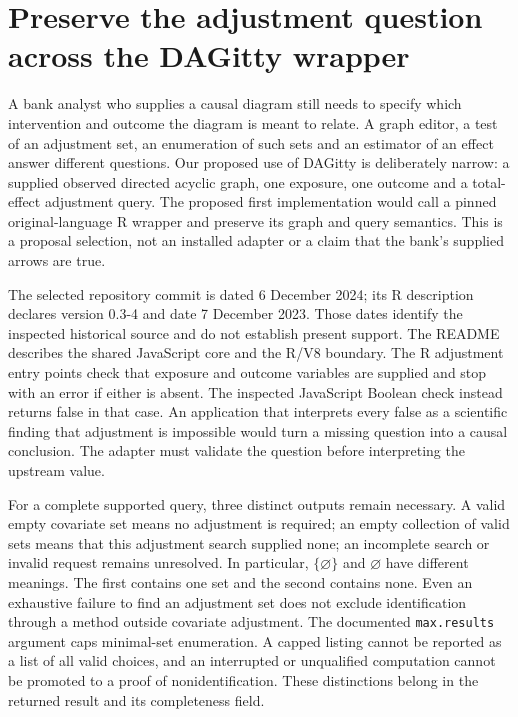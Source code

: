 \section{Preserve the adjustment question across the DAGitty wrapper}
\label{exec18:gp-graph}

A bank analyst who supplies a causal diagram still needs to specify which
intervention and outcome the diagram is meant to relate. A graph editor, a
test of an adjustment set, an enumeration of such sets and an estimator of an
effect answer different questions. Our proposed use of DAGitty is deliberately
narrow: a supplied observed directed acyclic graph, one exposure, one outcome
and a total-effect adjustment query. The proposed first implementation would
call a pinned original-language R wrapper and preserve its graph and query
semantics. This is a proposal selection, not an installed adapter or a claim
that the bank's supplied arrows are true.
\citep{exec18_gp_dagitty}

The selected repository commit is dated 6 December 2024; its R description
declares version 0.3-4 and date 7 December 2023. Those dates identify the
inspected historical source and do not establish present support. The README
describes the shared JavaScript core and the R/V8 boundary. The R adjustment
entry points check that exposure and outcome variables are supplied and stop
with an error if either is absent. The inspected JavaScript Boolean check
instead returns false in that case. An application that interprets every false
as a scientific finding that adjustment is impossible would turn a missing
question into a causal conclusion. The adapter must validate the question
before interpreting the upstream value. \citep{exec18_gp_dagitty}

For a complete supported query, three distinct outputs remain necessary.
A valid empty covariate set means no adjustment is required; an empty
collection of valid sets means that this adjustment search supplied none;
an incomplete search or invalid request remains unresolved. In particular,
\(\{\varnothing\}\) and \(\varnothing\) have different meanings. The first
contains one set and the second contains none. Even an exhaustive failure
to find an adjustment set does not exclude identification through a method
outside covariate adjustment. The documented \texttt{max.results} argument
caps minimal-set enumeration. A capped listing cannot be reported as a list
of all valid choices, and an interrupted or unqualified computation cannot
be promoted to a proof of nonidentification. These distinctions belong in
the returned result and its completeness field. \citep{exec18_gp_dagitty}

